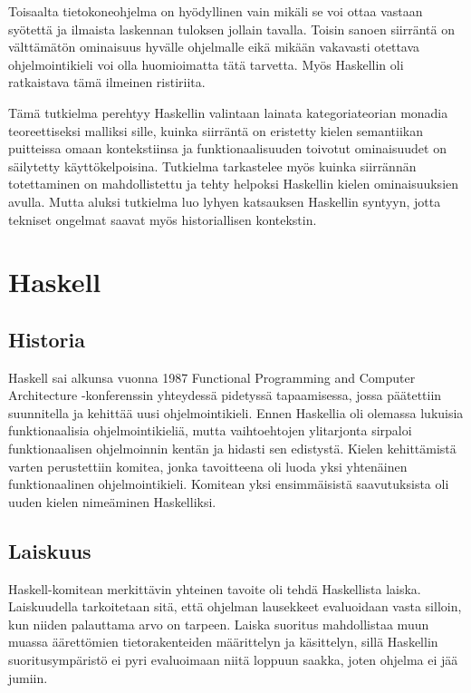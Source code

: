 \documentclass[finnish]{tktltiki2}
\begin{document}
Toisaalta tietokoneohjelma on hyödyllinen vain mikäli se voi ottaa vastaan syötettä ja ilmaista
laskennan tuloksen jollain tavalla. Toisin sanoen siirräntä on välttämätön ominaisuus hyvälle
ohjelmalle eikä mikään vakavasti otettava ohjelmointikieli voi olla huomioimatta tätä tarvetta. Myös
Haskellin oli ratkaistava tämä ilmeinen ristiriita.

Tämä tutkielma perehtyy Haskellin valintaan lainata kategoriateorian monadia teoreettiseksi malliksi
sille, kuinka siirräntä on eristetty kielen semantiikan puitteissa omaan kontekstiinsa ja
funktionaalisuuden toivotut ominaisuudet on säilytetty käyttökelpoisina. Tutkielma tarkastelee myös
kuinka siirrännän totettaminen on mahdollistettu ja tehty helpoksi Haskellin kielen ominaisuuksien
avulla. Mutta aluksi tutkielma luo lyhyen katsauksen Haskellin syntyyn, jotta tekniset ongelmat
saavat myös historiallisen kontekstin.



\section{Haskell} %

\subsection{Historia}

Haskell sai alkunsa vuonna 1987 Functional Programming and Computer Architecture -konferenssin
yhteydessä pidetyssä tapaamisessa, jossa päätettiin suunnitella ja kehittää uusi ohjelmointikieli.
Ennen Haskellia oli olemassa lukuisia funktionaalisia ohjelmointikieliä, mutta vaihtoehtojen
ylitarjonta sirpaloi funktionaalisen ohjelmoinnin kentän ja hidasti sen edistystä. Kielen
kehittämistä varten perustettiin komitea, jonka tavoitteena oli luoda yksi yhtenäinen
funktionaalinen ohjelmointikieli. Komitean yksi ensimmäisistä saavutuksista oli uuden kielen
nimeäminen Haskelliksi.

\subsection{Laiskuus}
\label{subsec:laiskuus}

Haskell-komitean merkittävin yhteinen tavoite oli tehdä Haskellista laiska. Laiskuudella
tarkoitetaan sitä, että ohjelman lausekkeet evaluoidaan vasta silloin, kun niiden palauttama arvo on
tarpeen. Laiska suoritus mahdollistaa muun muassa äärettömien tietorakenteiden määrittelyn ja
käsittelyn, sillä Haskellin suoritusympäristö ei pyri evaluoimaan niitä loppuun saakka, joten
ohjelma ei jää jumiin.
\end{document}

